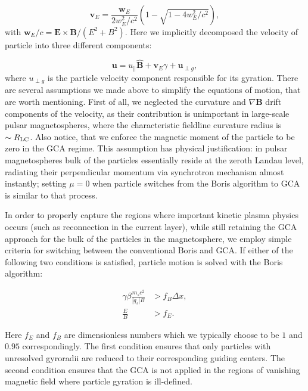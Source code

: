 \begin{equation}
    \bm{v}_E = \frac{\bm{w}_E}{2 w_E^2 / c^2}\left(1 - \sqrt{1 - 4 w_E^2 / c^2}\right),
\end{equation}
\noindent with $\bm{w}_E / c = \bm{E}\times\bm{B} / (E^2 + B^2)$. Here we implicitly decomposed the velocity of particle into three different components:

\begin{equation}
    \bm{u} = u_\parallel \hat{\bm{B}} + \bm{v}_E \gamma + \bm{u}_{\perp g},
\end{equation}
\noindent where $u_{\perp g}$ is the particle velocity component responsible for its gyration. There are several assumptions we made above to simplify the equations of motion, that are worth mentioning. First of all, we neglected the curvature and $\nabla\bm{B}$ drift components of the velocity, as their contribution is unimportant in large-scale pulsar magnetospheres, where the characteristic fieldline curvature radius is $\sim R_{\rm LC}$. Also notice, that we enforce the magnetic moment of the particle to be zero in the GCA regime. This assumption has physical justification: in pulsar magnetospheres bulk of the particles essentially reside at the zeroth Landau level, radiating their perpendicular momentum via synchrotron mechanism almost instantly; setting $\mu=0$ when particle switches from the Boris algorithm to GCA is similar to that process.

In order to properly capture the regions where important kinetic plasma physics occurs (such as reconnection in the current layer), while still retaining the GCA approach for the bulk of the particles in the magnetosphere, we employ simple criteria for switching between the conventional Boris and GCA. If either of the following two conditions is satisfied, particle motion is solved with the Boris algorithm:

\begin{equation}
    \begin{aligned}
        \gamma\beta \frac{m_s c^2}{|q_s| B} &> f_B \Delta x,\\
        \frac{E}{B} &> f_E.
    \end{aligned}
\end{equation}

\noindent Here $f_E$ and $f_B$ are dimensionless numbers which we typically choose to be $1$ and $0.95$ correspondingly. The first condition ensures that only particles with unresolved gyroradii are reduced to their corresponding guiding centers. The second condition ensures that the GCA is not applied in the regions of vanishing magnetic field where particle gyration is ill-defined. 